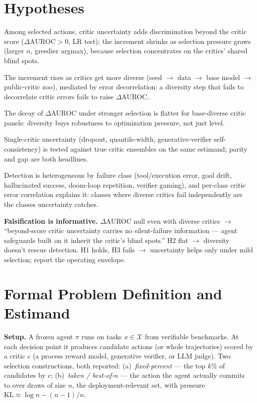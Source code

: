 \documentclass[11pt]{article}
\begin{document}
\section{Hypotheses}
\begin{description}[leftmargin=0em,itemsep=3pt]
  \item[H1 (beyond-score detection at selection).] Among selected actions, critic
    uncertainty adds discrimination beyond the critic score ($\Delta\text{AUROC}>0$,
    LR test); the increment shrinks as selection pressure grows (larger $n$, greedier
    argmax), because selection concentrates on the critics' shared blind spots.
  \item[H2 (diversity, mediated).] The increment rises as critics get more diverse
    (seed $\to$ data $\to$ base model $\to$ public-critic zoo), mediated by error
    decorrelation: a diversity step that fails to decorrelate critic errors fails to
    raise $\Delta$AUROC.
  \item[H3 (pressure $\times$ diversity).] The decay of $\Delta$AUROC under stronger
    selection is flatter for base-diverse critic panels: diversity buys robustness to
    optimization pressure, not just level.
  \item[H4 (cheap uncertainty).] Single-critic uncertainty (dropout, quantile-width,
    generative-verifier self-consistency) is tested against true critic ensembles on
    the same estimand; parity and gap are both headlines.
  \item[H5 (failure taxonomy).] Detection is heterogeneous by failure class
    (tool/execution error, goal drift, hallucinated success, doom-loop repetition,
    verifier gaming), and per-class critic error correlation explains it: classes
    where diverse critics fail independently are the classes uncertainty catches.
\end{description}
\textbf{Falsification is informative.} $\Delta$AUROC null even with diverse critics
$\to$ ``beyond-score critic uncertainty carries no silent-failure information ---
agent safeguards built on it inherit the critic's blind spots.'' H2 flat $\to$
diversity doesn't rescue detection. H1 holds, H3 fails $\to$ uncertainty helps only
under mild selection; report the operating envelope.

\section{Formal Problem Definition and Estimand}
\textbf{Setup.} A frozen agent $\pi$ runs on tasks $x\in\mathcal{X}$ from verifiable
benchmarks. At each decision point it produces candidate actions (or whole
trajectories) scored by a critic $c$ (a process reward model, generative verifier,
or LLM judge). Two selection constructions, both reported: (a)~\emph{fixed-percent}
--- the top $k\%$ of candidates by $c$; (b)~\emph{taken / best-of-$n$} --- the
action the agent actually commits to over draws of size $n$, the deployment-relevant
set, with pressure $\mathrm{KL}\approx \log n - (n-1)/n$.
\end{document}

